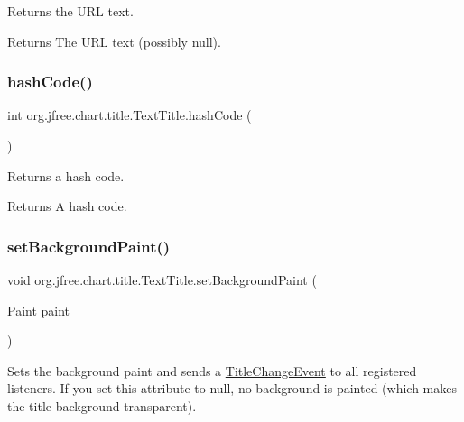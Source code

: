 Returns the U\+RL text.

\begin{DoxyReturn}{Returns}
The U\+RL text (possibly {\ttfamily null}). 
\end{DoxyReturn}
\mbox{\label{classorg_1_1jfree_1_1chart_1_1title_1_1_text_title_a92b467e51c0bff6dac98efbfe955a07c}} 
\subsubsection{\texorpdfstring{hash\+Code()}{hashCode()}}
{\footnotesize\ttfamily int org.\+jfree.\+chart.\+title.\+Text\+Title.\+hash\+Code (\begin{DoxyParamCaption}{ }\end{DoxyParamCaption})}

Returns a hash code.

\begin{DoxyReturn}{Returns}
A hash code. 
\end{DoxyReturn}
\mbox{\label{classorg_1_1jfree_1_1chart_1_1title_1_1_text_title_adb4e610b49ee1ca887a5f75841c89596}} 
\subsubsection{\texorpdfstring{set\+Background\+Paint()}{setBackgroundPaint()}}
{\footnotesize\ttfamily void org.\+jfree.\+chart.\+title.\+Text\+Title.\+set\+Background\+Paint (\begin{DoxyParamCaption}\item[{Paint}]{paint }\end{DoxyParamCaption})}

Sets the background paint and sends a \mbox{\hyperlink{}{Title\+Change\+Event}} to all registered listeners. If you set this attribute to {\ttfamily null}, no background is painted (which makes the title background transparent).


